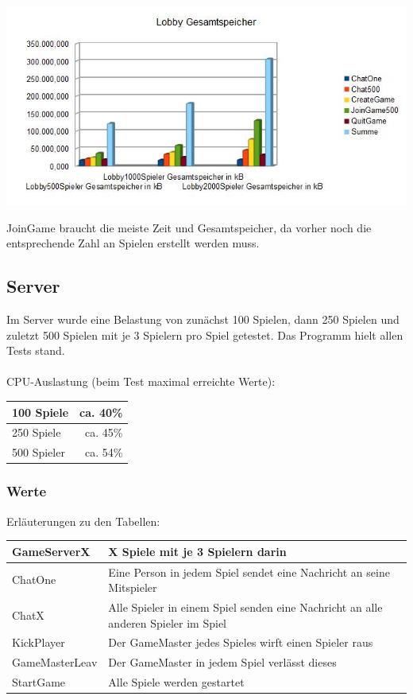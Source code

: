 \documentclass[a4paper]{article}
\begin{document}
\begin{center}
\includegraphics[scale=0.7]{5}
\end{center}

\noindent
JoinGame braucht die meiste Zeit und Gesamtspeicher, da vorher noch die entsprechende Zahl an Spielen erstellt werden muss.


\subsection{Server}
Im Server wurde eine Belastung von zunächst 100 Spielen, dann 250 Spielen und zuletzt 500 Spielen mit je 3 Spielern pro Spiel getestet. Das Programm hielt allen Tests stand.
\ \\ \ \\
\noindent
CPU-Auslastung (beim Test maximal erreichte Werte):\\
\noindent
\begin{tabular}{|l|r|}
\hline 
100 Spiele & ca. 40\% \\ \hline
250 Spiele & ca. 45\% \\ \hline
500 Spieler & ca. 54\%\\ \hline
\end{tabular}
\subsubsection{Werte}

Erläuterungen zu den Tabellen: \\
\noindent
\begin{tabular}{|l|l|}
\hline 
GameServerX & X Spiele mit je 3 Spielern darin\\ \hline
ChatOne & Eine Person in jedem Spiel sendet eine Nachricht an seine Mitspieler\\ \hline
ChatX & Alle Spieler in einem Spiel senden eine Nachricht an alle anderen Spieler im Spiel\\ \hline
KickPlayer & Der GameMaster jedes Spieles wirft einen Spieler raus\\ \hline
GameMasterLeav & Der GameMaster in jedem Spiel verlässt dieses\\ \hline
StartGame & Alle Spiele werden gestartet\\ \hline
\end{tabular}
\end{document}
